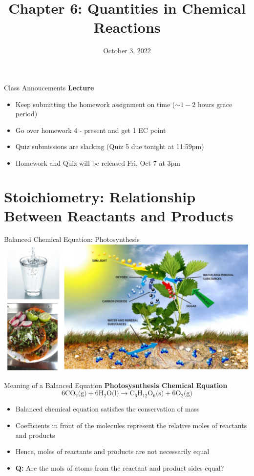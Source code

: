 \documentclass[11pt]{beamer}
\title{Chapter 6: Quantities in Chemical Reactions}
\institute{Chemistry Department, Cypress College}
\date{October 3, 2022}
\begin{document}
\begin{frame}
  \titlepage
\end{frame}

\begin{frame}{Class Annoucements}
  \textbf{Lecture}
  \begin{itemize}
  \item Keep submitting the homework assignment on time
    ($\sim 1-2$ hours grace period)
  \item Go over homework 4 - present and get 1 EC point
  \item Quiz submissions are slacking (Quiz 5 due tonight
    at 11:59pm)
  \item Homework and Quiz will be released Fri, Oct 7 at 3pm
  \end{itemize}
\end{frame}

\section{Stoichiometry: Relationship Between Reactants and Products}

\begin{frame}{Balanced Chemical Equation: Photosynthesis}
  \centering
  \includegraphics[trim={8in 0 0 0},clip,width=1\linewidth]{food_pic}
\end{frame}

\begin{frame}{Meaning of a Balanced Equation}
  \textbf{Photosysnthesis Chemical Equation}
  \begin{equation}
    6\text{CO$_2$(g)} + 6\text{H$_2$O(l)} \rightarrow \text{C$_6$H$_{12}$O$_6$(s)}
    + 6\text{O$_2$(g)}
  \end{equation}
  
  \begin{itemize}
  \item Balanced chemical equation satisfies the conservation of mass
  \item Coefficients in front of the molecules represent the relative
    moles of reactants and products
  \item Hence, moles of reactants and products are not necessarily
    equal
  \item \textbf{Q:} Are the mols of atoms from the reactant and
    product sides equal?
  \end{itemize}
\end{frame}
\end{document}
